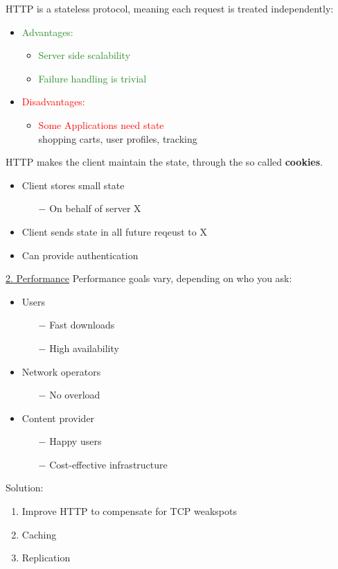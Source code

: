 \documentclass[a4paper, fontsize=8pt, landscape, DIV=1]{scrartcl}
\begin{document}
\begin{multicols*}{4}
		HTTP is a stateless protocol, meaning each request is treated independently:
		\begin{itemize}[noitemsep]
			\item \textcolor{ForestGreen}{Advantages:}
			\begin{itemize}
				\item \textcolor{ForestGreen}{Server side scalability}
				\item \textcolor{ForestGreen}{Failure handling is trivial}
			\end{itemize}
			\item \textcolor{red}{Disadvantages:}
			\begin{itemize}
				\item \textcolor{red}{Some Applications need state} \\
				shopping carts, user profiles, tracking
			\end{itemize} 
		\end{itemize}
		HTTP makes the client maintain the state, through the so called \textbf{cookies}.
		\begin{itemize}[noitemsep]
			\item Client stores small state
			\begin{itemize}
				\item[$-$] On behalf of server X
			\end{itemize}
			\item Client sends state in all future reqeust to X
			\item Can provide authentication
		\end{itemize}
		\par 
		
		\underline{2. Performance}
		Performance goals vary, depending on who you ask: 
		\begin{itemize}[noitemsep]
			\item Users
			\begin{itemize}
				\item[$-$] Fast downloads
				\item[$-$] High availability
			\end{itemize}
			\item Network operators
			\begin{itemize}
				\item[$-$] No overload
			\end{itemize}
			\item Content provider
			\begin{itemize}
				\item[$-$] Happy users
				\item[$-$] Cost-effective infrastructure 
			\end{itemize}
		\end{itemize}
		Solution:
		\begin{enumerate}[label=(\roman*),noitemsep]
			\item Improve HTTP to compensate for TCP weakspots
			\item Caching 
			\item Replication
		\end{enumerate}
		\par 
		

\end{multicols*}
\end{document}
